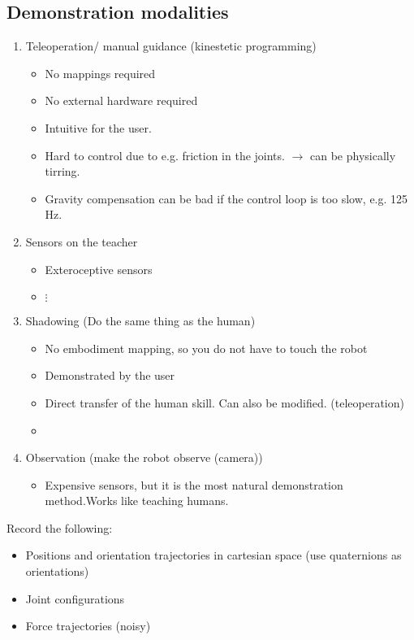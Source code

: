 \documentclass[a4paper]{article}
\begin{document}
\subsection{Demonstration modalities}
\begin{enumerate}
	\item Teleoperation/ manual guidance (kinestetic programming)
		\begin{itemize}
			\item No mappings required
			\item No external hardware required
			\item Intuitive for the user.
			\item Hard to control due to e.g. friction in the joints. $ \rightarrow $ can be physically tirring.
			\item Gravity compensation can be bad if the control loop is too slow, e.g. 125 Hz.
		\end{itemize}
	\item Sensors on the teacher
		\begin{itemize}
			\item Exteroceptive sensors 
			\item $ \vdots $
		\end{itemize}
	\item Shadowing (Do the same thing as the human)
		\begin{itemize}
			\item No embodiment mapping, so you do not have to touch the robot
			\item Demonstrated by the user
			\item Direct transfer of the human skill. Can also be modified. (teleoperation)
			\item 
		\end{itemize}
	\item Observation (make the robot observe (camera))
		\begin{itemize}
			\item Expensive sensors, but it is the most natural demonstration method.Works like teaching humans.
		\end{itemize}
\end{enumerate}

Record the following: 
\begin{itemize}
	\item Positions and orientation trajectories in cartesian space (use quaternions as orientations)
	\item Joint configurations
	\item Force trajectories (noisy)
\end{itemize}
\end{document}
